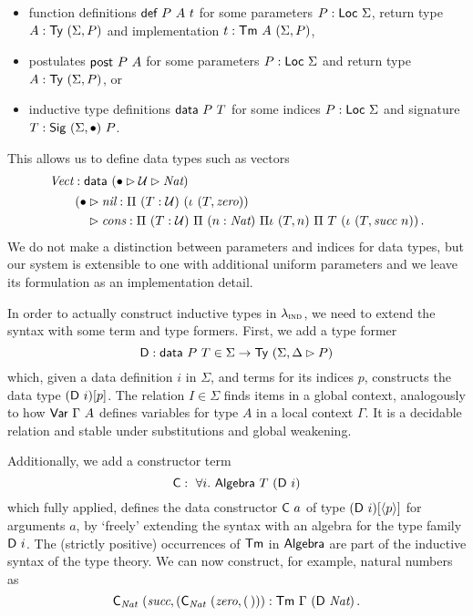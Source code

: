 \begin{itemize}
	\item function definitions $\mta{def}\ P\ A\ t$ for some parameters $P : \textsf{Loc}\
		      \Sigma$, return type $A : \textsf{Ty}\ (\Sigma, P)$ and implementation $t : \textsf{Tm}\ A\ (\Sigma, P)$,
	\item postulates $\textsf{post}\ P\ A$ for some parameters $P : \textsf{Loc}\
		      \Sigma$ and return type $A : \textsf{Ty}\ (\Sigma, P)$, or
	\item inductive type definitions $\mta{data}\ P\ T$ for some indices $P :
		      \textsf{Loc}\ \Sigma$ and signature $T : \textsf{Sig}\ (\Sigma, \bullet)\ P$.
\end{itemize}

This allows us to define data types such as vectors
\begin{align*}
	 & \textit{Vect} : \textsf{data}\ (\bullet \rhd \mathcal{U} \rhd \textit{Nat})               \\
	 & \quad\begin{aligned}
		        \quad (\bullet & \rhd \textit{nil} : \Pi\ (T : \mathcal{U})\ (\iota\ (T, \textit{zero}))                                                          \\
		        \quad          & \rhd \textit{cons} : \Pi\ (T : \mathcal{U})\ \Pi\ (n : \textit{Nat})\ \Pi\iota\ (T, n)\ \Pi\ T\ (\iota\ (T, \textit{succ}\ n)) \,.
	        \end{aligned}
\end{align*}
We do not make a distinction between parameters and indices for data types, but
our system is extensible to one with additional uniform parameters and we leave its
formulation as an implementation detail.

In order to actually construct inductive types in $\lambda_{\textsc{ind}}$, we need to
extend the syntax with some term and type formers. First, we add a type former
\[
	\mta{D} : \mta{data}\ P\ T \in \Sigma \to \Ty\ (\Sigma, \Delta \rhd P)
\]
which, given a data definition $i$ in $\Sigma$, and terms for its
indices $p$, constructs the data type $(\mta{D}\ i)[p]$. The relation $I \in
\Sigma$ finds items in a global context, analogously to how
$\mta{Var}\ \Gamma\ A$ defines variables for type $A$ in a local context
$\Gamma$. It is a decidable relation and stable under substitutions and global weakening.

Additionally, we add a constructor term
\[
	\mta{C} :\ \forall i.\ \mta{Algebra}\ T\ (\mta{D}\ i)
\]
which fully applied, defines the data constructor $\textsf{C}\ a$ of type
$(\textsf{D}\ i)[\langle p\rangle]$ for arguments $a$, by `freely' extending the syntax with
an algebra for the type family $\textsf{D}\ i$. The (strictly positive) occurrences
of $\textsf{Tm}$ in $\textsf{Algebra}$ are part of the inductive syntax of the type
theory. We can now construct, for example, natural numbers as
\[
    \mta{C}_{\textit{Nat}}\ (\textit{succ}, (\mta{C}_{\textit{Nat}}\ (\textit{zero}, (\,))) : \mta{Tm}\ \Gamma\ (\mta{D}\ \textit{Nat}) \,.
\]

